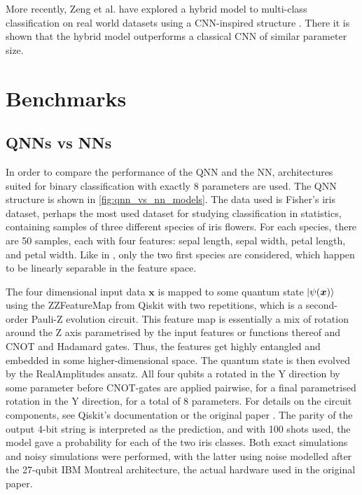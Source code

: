More recently, Zeng et al. have explored a hybrid model to multi-class classification on real world datasets using a CNN-inspired structure \cite{zeng2022}. There it is shown that the hybrid model outperforms a classical CNN of similar parameter size.

\section{Benchmarks}
\subsection{QNNs vs NNs}\label{sec:qnn-vs-nn}
In order to compare the performance of the QNN and the NN, architectures suited for binary classification with exactly 8 parameters are used. The QNN structure is shown in \cref{fig:qnn_vs_nn_models}. The data used is Fisher's iris dataset, perhaps the most used dataset for studying classification in statistics, containing samples of three different species of iris flowers. For each species, there are 50 samples, each with four features: sepal length, sepal width, petal length, and petal width. Like in \cite{abbas2021}, only the two first species are considered, which happen to be linearly separable in the feature space.

The four dimensional input data $\bm{x}$ is mapped to some quantum state $\ket{\psi(\bm{x})}$ using the ZZFeatureMap from Qiskit with two repetitions, which is a second-order Pauli-Z evolution circuit. This feature map is essentially a mix of rotation around the Z axis parametrised by the input features or functions thereof and CNOT and Hadamard gates. Thus, the features get highly entangled and embedded in some higher-dimensional space. The quantum state is then evolved by the RealAmplitudes ansatz. All four qubits a rotated in the Y direction by some parameter before CNOT-gates are applied pairwise, for a final parametrised rotation in the Y direction, for a total of 8 parameters. For details on the circuit components, see Qiskit's documentation \cite{qiskit} or the original paper \cite{abbas2021}. The parity of the output 4-bit string is interpreted as the prediction, and with 100 shots used, the model gave a probability for each of the two iris classes. Both exact simulations and noisy simulations were performed, with the latter using noise modelled after the 27-qubit IBM Montreal architecture, the actual hardware used in the original paper.

